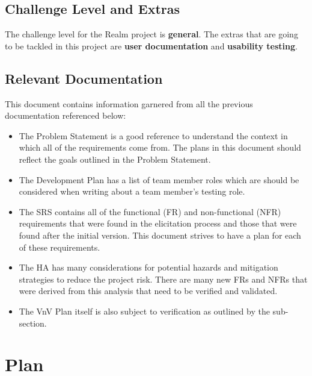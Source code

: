 \documentclass[12pt, titlepage]{article}
\begin{document}
\subsection{Challenge Level and Extras}

The challenge level for the Realm project is \textbf{general}. The extras that are going to be tackled in this project are \textbf{user documentation} and \textbf{usability testing}.

\subsection{Relevant Documentation}

This document contains information garnered from all the previous documentation referenced below:

\begingroup
    \raggedright
    \renewcommand{\refname}{}
    \vspace{-3em}
    \printbibliography
\endgroup

\begin{itemize}
    \item The Problem Statement \cite{ProblemStatement} is a good reference to understand the context in which all of the requirements come from. The plans in this document should reflect the goals outlined in the Problem Statement.
    \item The Development Plan \cite{DevelopmentPlan} has a list of team member roles which are should be considered when writing about a team member's testing role.
    \item The SRS \cite{SRS} contains all of the functional (FR) and non-functional (NFR) requirements that were found in the elicitation process and those that were found after the initial version. This document strives to have a plan for each of these requirements.
    \item The HA \cite{HA} has many considerations for potential hazards and mitigation strategies to reduce the project risk. There are many new FRs and NFRs that were derived from this analysis that need to be verified and validated.
    \item The VnV Plan \cite{VnV} itself is also subject to verification as outlined by the  sub-section.
\end{itemize}

\newrefsection

\section{Plan}
\label{sub:plan}
\end{document}
